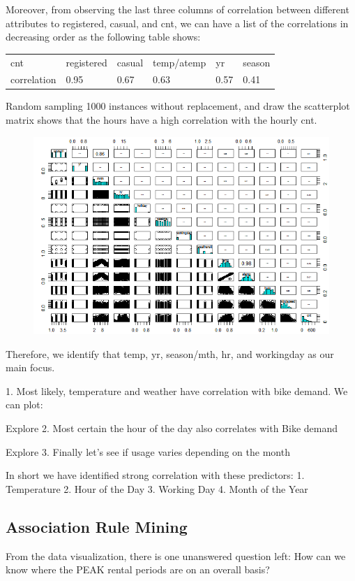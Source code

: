 \documentclass[12pt]{article}
\begin{document}
Moreover, from observing the last three columns of correlation between different attributes to registered, casual, and cnt, we can have a list of the correlations in decreasing order as the following table shows: 
\begin{table}[H]
	\begin{tabular}{| l | l | l | l | l | l|}
		cnt~ & registered & casual & temp/atemp & yr & season\\
		correlation & 0.95 & 0.67 & 0.63 & 0.57 & 0.41\\
		\hline
	\end{tabular}
\end{table}
Random sampling 1000 instances without replacement, and draw the scatterplot matrix shows that the hours have a high correlation with the hourly cnt. 
\begin{figure}[H]
	\includegraphics[scale=0.8]{figures/scatterplot_col_season.png}
	\end{figure}

Therefore, we identify that temp, yr, season/mth, hr, and workingday as our main focus.

1. Most likely, temperature and weather have correlation with bike demand. We can plot:

Explore 2. Most certain the hour of the day also correlates with Bike demand 

Explore 3. Finally let’s see if usage varies depending on the month 

In short we have identified strong correlation with these predictors: 1. Temperature 2. Hour of the Day 3. Working Day 4. Month of the Year

\subsection{Association Rule Mining}
From the data visualization, there is one unanswered question left: How can we know where the PEAK rental periods are on an overall basis?
\end{document}

